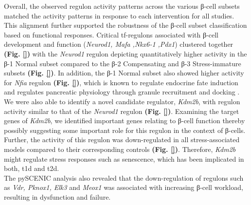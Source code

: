 
Overall, the observed regulon activity patterns across the various β-cell subsets matched the activity patterns in response to each intervention for all studies. This alignment further supported the robustness of the β-cell subset classification based on functional responses. Critical \gls{tf}-regulons associated with β-cell development and function (\textit{Neurod1, Mafa ,Nkx6-1 ,Pdx1}) clustered together \textbf{(Fig. \ref{})} with the \textit{Neurod1} regulon depicting quantitatively higher activity in the β-1 Normal subset compared to the β-2 Compensating and β-3 Stress-immature subsets \textbf{(Fig. \ref{})}. In addition, the β-1 Normal subset also showed higher activity for \textit{Nfia} regulon \textbf{(Fig. \ref{})}, which is known to regulate endocrine fate induction \textbf{\cite{scavuzzo_pancreatic_2018}} and regulates pancreatic physiology through granule recruitment and docking \textbf{\cite{scavuzzo_nfia_2019}}. We were also able to identify a novel candidate regulator, \textit{Kdm2b}, with regulon activity similar to that of the \textit{Neurod1} regulon \textbf{(Fig. \ref{})}. Examining the target genes of \textit{Kdm2b}, we identified important genes relating to  β-cell function thereby possibly suggesting some important role for this regulon in the context of β-cells. Further, the activity of this regulon was down-regulated in all stress-associated models compared to their corresponding controls \textbf{(Fig. \ref{})}. Therefore, \textit{Kdm2b} might regulate stress responses such as senescence, which has been implicated in both, \gls{t1d} and \gls{t2d}.\\ 

The pySCENIC analysis also revealed that the down-regulation of regulons such as \textit{Vdr, Pknox1, Elk3} and \textit{Meox1} was associated with increasing β-cell workload, resulting in dysfunction and failure. 


